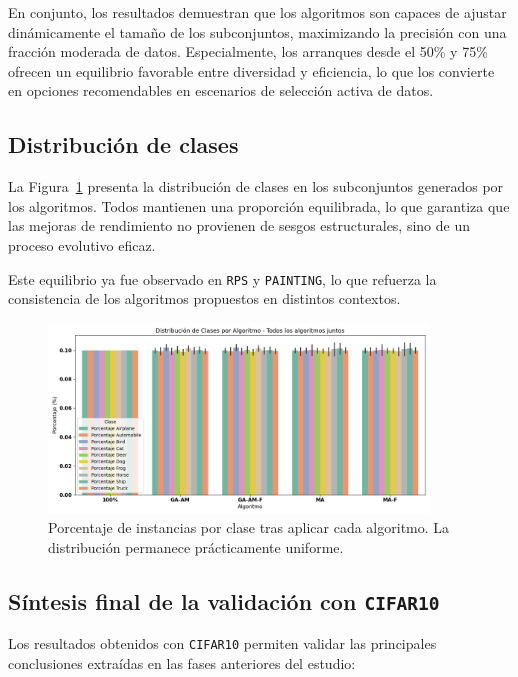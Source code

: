 En conjunto, los resultados demuestran que los algoritmos son capaces de ajustar dinámicamente el tamaño de los subconjuntos, maximizando la precisión con una fracción moderada de datos.
Especialmente, los arranques desde el 50\% y 75\% ofrecen un equilibrio favorable entre diversidad y eficiencia,
lo que los convierte en opciones recomendables en escenarios de selección activa de datos.

\subsection{Distribución de clases}
La Figura~\ref{fig:cifar10_balance} presenta la distribución de clases en los subconjuntos generados por los algoritmos.
Todos mantienen una proporción equilibrada, lo que garantiza que las mejoras de rendimiento no provienen de sesgos estructurales, sino de un proceso evolutivo eficaz.

Este equilibrio ya fue observado en \texttt{RPS} y \texttt{PAINTING}, lo que refuerza la consistencia de los algoritmos propuestos en distintos contextos.

\begin{figure}[htp]
  \centering
  \includegraphics[width=0.9\textwidth]{imagenes/evaluaciones/cifar10/balance-de-clases.png}
  \caption{
    Porcentaje de instancias por clase tras aplicar cada algoritmo.
    La distribución permanece prácticamente uniforme.
  }
  \label{fig:cifar10_balance}
\end{figure}

\subsection{Síntesis final de la validación con \texttt{CIFAR10}}
Los resultados obtenidos con \texttt{CIFAR10} permiten validar las principales conclusiones extraídas en las fases anteriores del estudio:

